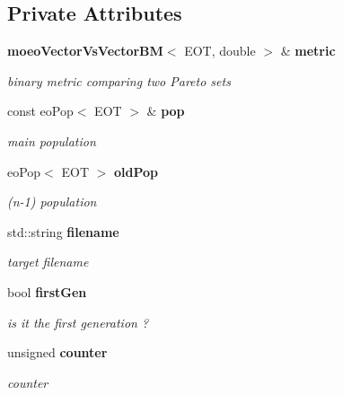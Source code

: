 \subsection*{Private Attributes}
\begin{CompactItemize}
\item 
{\bf moeo\-Vector\-Vs\-Vector\-BM}$<$ EOT, double $>$ \& {\bf metric}\label{classmoeoBinaryMetricSavingUpdater_52e12414a266bce1dbce0b913025fd37}

\begin{CompactList}\small\item\em binary metric comparing two Pareto sets \item\end{CompactList}\item 
const eo\-Pop$<$ EOT $>$ \& {\bf pop}\label{classmoeoBinaryMetricSavingUpdater_9c30673aca66a1531856cb92068edaf7}

\begin{CompactList}\small\item\em main population \item\end{CompactList}\item 
eo\-Pop$<$ EOT $>$ {\bf old\-Pop}\label{classmoeoBinaryMetricSavingUpdater_c1751bf23ef440d895a39cdff25c384c}

\begin{CompactList}\small\item\em (n-1) population \item\end{CompactList}\item 
std::string {\bf filename}\label{classmoeoBinaryMetricSavingUpdater_32c78860e3aee52346df3aa30c5ac42f}

\begin{CompactList}\small\item\em target filename \item\end{CompactList}\item 
bool {\bf first\-Gen}\label{classmoeoBinaryMetricSavingUpdater_1e40103a5cfa592a9d2408102e507a19}

\begin{CompactList}\small\item\em is it the first generation ? \item\end{CompactList}\item 
unsigned {\bf counter}\label{classmoeoBinaryMetricSavingUpdater_280b52506c280b07356726ad5d497ef8}

\begin{CompactList}\small\item\em counter \item\end{CompactList}\end{CompactItemize}


